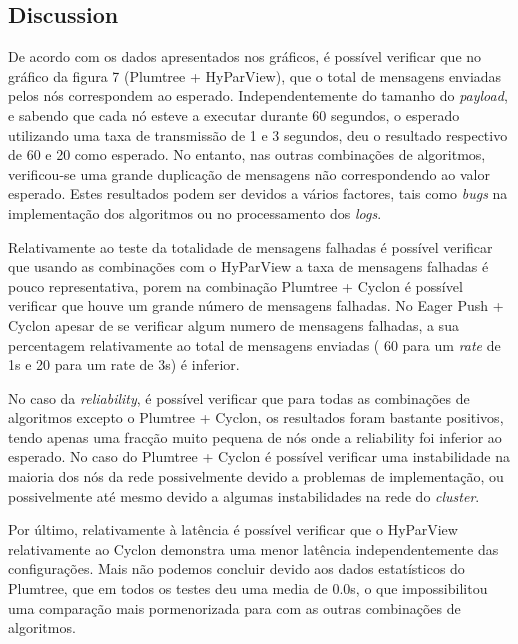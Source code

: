 
\subsection{Discussion}


De acordo com os dados apresentados nos gráficos, é possível verificar que no gráfico da figura 7 (Plumtree + HyParView), que o total de mensagens enviadas pelos nós correspondem ao esperado. Independentemente do tamanho do \textit{payload}, e sabendo que cada nó esteve a executar durante 60 segundos, o esperado utilizando uma taxa de transmissão de 1 e 3 segundos, deu o resultado respectivo de 60 e 20 como esperado.
No entanto, nas outras combinações de algoritmos, verificou-se uma grande duplicação de mensagens não correspondendo ao valor esperado. Estes resultados podem ser devidos a vários factores, tais como \textit{bugs} na implementação dos algoritmos ou no processamento dos \textit{logs}.

Relativamente ao teste da totalidade de mensagens falhadas é possível verificar que usando as combinações com o HyParView a taxa de mensagens falhadas é pouco representativa, porem na combinação  Plumtree + Cyclon é possível verificar que houve um grande número de mensagens falhadas. No  Eager Push + Cyclon apesar de se verificar algum numero de mensagens falhadas, a sua percentagem relativamente ao total de mensagens enviadas ( 60 para um\textit{ rate} de 1s e 20 para um rate de 3s) é inferior.

No caso da\textit{ reliability}, é possível verificar que para todas as combinações de algoritmos excepto o Plumtree + Cyclon, os resultados foram bastante positivos, tendo apenas uma fracção muito pequena de nós onde a reliability foi inferior ao esperado. No caso do Plumtree + Cyclon é possível verificar uma instabilidade na maioria dos nós da rede possivelmente devido a problemas de implementação, ou possivelmente até mesmo devido a algumas instabilidades na rede do \textit{cluster}.

Por último, relativamente à latência é possível verificar que o HyParView relativamente ao Cyclon demonstra uma menor latência independentemente das configurações. Mais não podemos concluir devido aos dados estatísticos do Plumtree, que em todos os testes deu uma media de 0.0s, o que impossibilitou uma comparação mais pormenorizada para com as outras combinações de algoritmos.